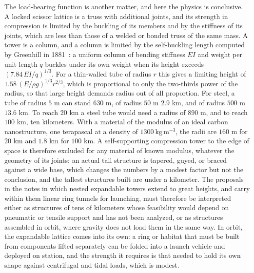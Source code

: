 The load-bearing function is another matter, and here the physics is conclusive. A locked scissor lattice is a truss with additional joints, and its strength in compression is limited by the buckling of its members and by the stiffness of its joints, which are less than those of a welded or bonded truss of the same mass. A tower is a column, and a column is limited by the self-buckling length computed by Greenhill in 1881~\cite{greenhill1881}: a uniform column of bending stiffness $EI$ and weight per unit length $q$ buckles under its own weight when its height exceeds $(7.84\,EI/q)^{1/3}$. For a thin-walled tube of radius $r$ this gives a limiting height of $1.58\,(E/\rho g)^{1/3}r^{2/3}$, which is proportional to only the two-thirds power of the radius, so that large height demands radius out of all proportion. For steel, a tube of radius $5$ m can stand $630$ m, of radius $50$ m $2.9$ km, and of radius $500$ m $13.6$ km. To reach $20$ km a steel tube would need a radius of $890$ m, and to reach $100$ km, ten kilometers. With a material of the modulus of an ideal carbon nanostructure, one terapascal at a density of $1300\ \mathrm{kg\,m^{-3}}$, the radii are $160$ m for $20$ km and $1.8$ km for $100$ km. A self-supporting compression tower to the edge of space is therefore excluded for any material of known modulus, whatever the geometry of its joints; an actual tall structure is tapered, guyed, or braced against a wide base, which changes the numbers by a modest factor but not the conclusion, and the tallest structures built are under a kilometer. The proposals in the notes in which nested expandable towers extend to great heights, and carry within them linear ring tunnels for launching, must therefore be interpreted either as structures of tens of kilometers whose feasibility would depend on pneumatic or tensile support and has not been analyzed, or as structures assembled in orbit, where gravity does not load them in the same way. In orbit, the expandable lattice comes into its own: a ring or habitat that must be built from components lifted separately can be folded into a launch vehicle and deployed on station, and the strength it requires is that needed to hold its own shape against centrifugal and tidal loads, which is modest.


